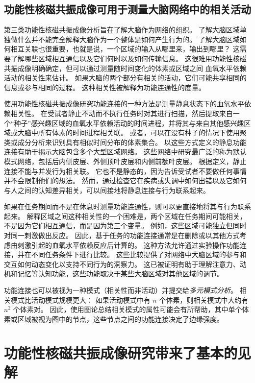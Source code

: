 \subsection{功能性核磁共振成像可用于测量大脑网络中的相关活动}

第三类功能性核磁共振成像分析旨在了解大脑作为网络的组织。
了解大脑区域单独做什么并不能完全解释大脑作为一个整体是如何产生行为的。
了解大脑区域如何相互关联也很重要，也就是说，一个区域的输入从哪里来，输出到哪里？
这需要了解哪些区域相互通信以及它们何时以及如何传输信息。
这很难用功能性核磁共振成像明确确定，但可以通过测量随时间变化的体素或区域之间 血氧水平依赖活动的相关性来估计。
如果大脑的两个部分有相关的活动，它们可能共享相同的信息或参与相同的过程。
这种相关性被解释为功能连通性的度量。


使用功能性核磁共振成像研究功能连接的一种方法是测量静息状态下的血氧水平依赖相关性。 
在受试者静止不动而不执行任务时对其进行扫描，然后提取来自一个“种子”感兴趣区域的血氧水平依赖活动的时间进程，并将其与来自其他感兴趣区域或大脑中所有体素的时间进程相关联。
或者，可以在没有种子的情况下使用聚类或成分分析来识别具有相似时间分布的体素集合。
以这些方式定义的静息功能连接有助于揭示大脑包含多个大型区域网络。
这些网络中研究最广泛的称为默认模式网络，包括后内侧皮层、外侧顶叶皮层和内侧前额叶皮层。
根据定义，静止连接不能与并发行为相关联。
它也不是静态的，因为告诉受试者不要做任何事情并不会限制他们的想法。
然而，通过检查它在疾病或失调中如何出错以及它如何与人之间的认知差异相关，可以间接地将静息连接与行为联系起来。


如果在任务期间而不是在休息时测量功能连通性，则可以更直接地将其与行为联系起来。 
解释区域之间这种相关性的一个困难是，两个区域在任务期间可能相关，不是因为它们相互通信，而是因为第三个变量。
例如，这些区域可能独立但同时对同一刺激做出反应。
因此，基于任务的功能连接通常是在删除或以其他方式考虑由刺激引起的血氧水平依赖反应后计算的。 
这种方法允许通过实验操作功能连接，并在不同任务条件下进行比较。
这些比较提供了对网络中大脑区域的参与和交互如何动态变化以支持不同行为的洞察力。
这已被证明有助于理解注意力、动机和记忆等认知功能，这些功能取决于某些大脑区域对其他区域的调节。


功能连接也可以被视为一种模式（相关性而非活动）并提交给\textit{多元模式分析}。 
相关模式比活动模式规模更大：
如果活动模式中有 $n$ 个体素，则相关模式中大约有 $n^2$ 个体素对。
因此，使用图论总结相关模式的属性可能会有所帮助，其中单个体素或区域被视为图中的节点，这些节点之间的功能连接决定了边缘强度。



\section{功能性核磁共振成像研究带来了基本的见解}

